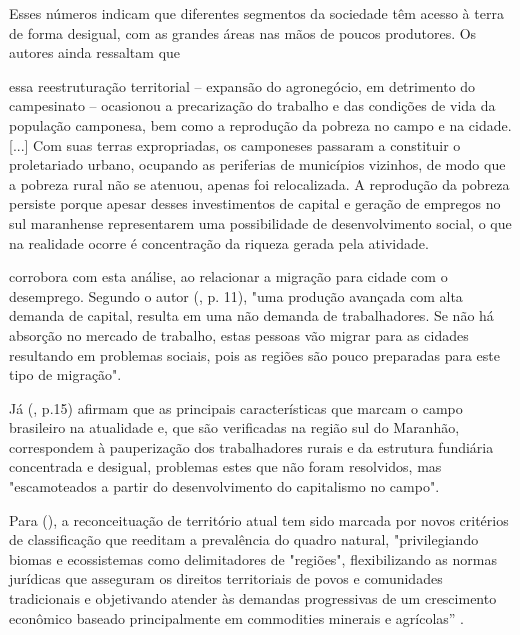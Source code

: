 Esses números indicam que diferentes segmentos da sociedade têm acesso à terra de forma desigual, com as grandes áreas nas mãos de poucos produtores. Os autores ainda ressaltam que

\begin{citacao}
essa reestruturação territorial – expansão do agronegócio, em detrimento do campesinato – ocasionou a precarização do trabalho e das condições de vida da população camponesa, bem como a reprodução da pobreza no campo e na cidade. [...] Com suas terras expropriadas, os camponeses passaram a constituir o proletariado urbano, ocupando as periferias de municípios vizinhos, de modo que a pobreza rural não se atenuou, apenas foi relocalizada. A reprodução da pobreza persiste porque apesar desses investimentos de capital e geração de empregos no sul maranhense representarem uma possibilidade de desenvolvimento social, o que na realidade ocorre é concentração da riqueza gerada pela atividade.
\cite[p. 12-16]{lima_locatel_silva}
\end{citacao}

 corrobora com esta análise, ao relacionar a migração para cidade com o desemprego. Segundo o autor (\citeyear{studte2008}, p. 11), "uma produção avançada com alta demanda de capital, resulta em uma não demanda de trabalhadores. Se não há absorção no mercado de trabalho, estas pessoas vão migrar para as cidades resultando em problemas sociais, pois as regiões são pouco preparadas para este tipo de migração".

Já  (\citeyear{lima_locatel_silva}, p.15) afirmam que as principais características que marcam o campo brasileiro na atualidade e, que são verificadas na região sul do Maranhão, correspondem à pauperização dos trabalhadores rurais e da estrutura fundiária concentrada e desigual, problemas estes que não foram resolvidos, mas "escamoteados a partir do desenvolvimento do capitalismo no campo".

Para  (\citeyear{almeida}), a reconceituação de território atual tem sido marcada por novos critérios de classificação que reeditam a prevalência do quadro natural, "privilegiando biomas e ecossistemas como delimitadores de "regiões", flexibilizando as normas jurídicas que asseguram os direitos territoriais de povos e comunidades tradicionais e objetivando atender às demandas progressivas de um crescimento econômico baseado principalmente em commodities minerais e agrícolas” \cite{almeida}.

